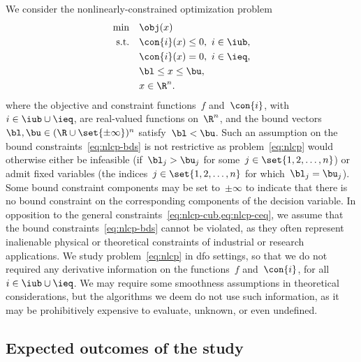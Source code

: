 We consider the nonlinearly-constrained optimization problem
\begin{subequations}
    \label{eq:nlcp}
    \begin{align}
        \min        & \quad \obj(x) \label{eq:nlcp-obj}\\
        \text{s.t.} & \quad \con{i}(x) \le 0, ~ i \in \iub, \label{eq:nlcp-cub}\\
                    & \quad \con{i}(x) = 0, ~ i \in \ieq, \label{eq:nlcp-ceq}\\
                    & \quad \bl \le x \le \bu, \label{eq:nlcp-bds}\\
                    & \quad x \in \R^n. \nonumber
    \end{align}
\end{subequations}
%
%
%
%
where the objective and constraint functions~$f$ and~$\con{i}$, with~$i \in \iub \cup \ieq$, are real-valued functions on~$\R^n$, and the bound vectors~$\bl, \bu \in (\R \cup \set{\pm \infty})^n$ satisfy~$\bl < \bu$.
Such an assumption on the bound constraints~\cref{eq:nlcp-bds} is not restrictive as problem~\cref{eq:nlcp} would otherwise either be infeasible (if~$\bl_j > \bu_j$ for some~$j \in \set{1, 2, \dots, n}$) or admit fixed variables (the indices~$j \in \set{1, 2, \dots, n}$ for which~$\bl_j = \bu_j$).
Some bound constraint components may be set to~$\pm \infty$ to indicate that there is no bound constraint on the corresponding components of the decision variable.
In opposition to the general constraints~\cref{eq:nlcp-cub,eq:nlcp-ceq}, we assume that the bound constraints~\cref{eq:nlcp-bds} cannot be violated, as they often represent inalienable physical or theoretical constraints of industrial or research applications.
We study problem~\cref{eq:nlcp} in \gls{dfo} settings, so that we do not required any derivative information on the functions~$f$ and~$\con{i}$, for all~$i \in \iub \cup \ieq$.
We may require some smoothness assumptions in theoretical considerations, but the algorithms we deem do not use such information, as it may be prohibitively expensive to evaluate, unknown, or even undefined.

\subsection{Expected outcomes of the study}

